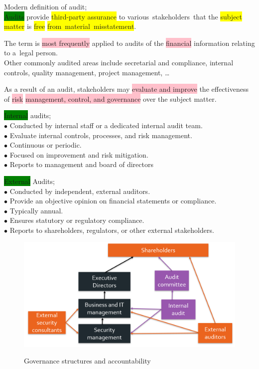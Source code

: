 \documentclass[tikz,border=10pt]{project_plan}
\newcommand{\bulletPoint}{\hspace{-3.1pt}$\bullet$ \hspace{5pt}}
\begin{document}
Modern definition of audit;\\
\colorbox{green}{Audits} provide \colorbox{yellow}{third-party assurance} to various stakeholders that the \colorbox{yellow}{subject matter} is
\colorbox{yellow}{free} \colorbox{yellow}{from material misstatement}.

The term is \colorbox{pink}{most frequently} applied to audits of the \colorbox{pink}{financial} information relating to a legal person. \\
Other commonly audited areas include secretarial and compliance, internal controls, quality management, project management, …

As a result of an audit, stakeholders may \colorbox{pink}{evaluate and improve} the effectiveness
of \colorbox{pink}{risk} \colorbox{pink}{management, control, and governance} over the subject matter.

\colorbox{green}{Internal} audits;\\
\bulletPoint Conducted by internal staff or a dedicated internal audit team.\\
\bulletPoint Evaluate internal controls, processes, and risk management.\\
\bulletPoint Continuous or periodic.\\
\bulletPoint Focused on improvement and risk mitigation.\\
\bulletPoint Reports to management and board of directors

\colorbox{green}{External} Audits;\\
\bulletPoint Conducted by independent, external auditors.\\
\bulletPoint Provide an objective opinion on financial statements or compliance.\\
\bulletPoint Typically annual.\\
\bulletPoint Ensures statutory or regulatory compliance.\\
\bulletPoint Reports to shareholders, regulators, or other external stakeholders.

\begin{figure}[H]
  \centering
  \includegraphics[width=\linewidth]{governance structures and accountability.png}

  Governance structures and accountability
\end{figure}
\end{document}
